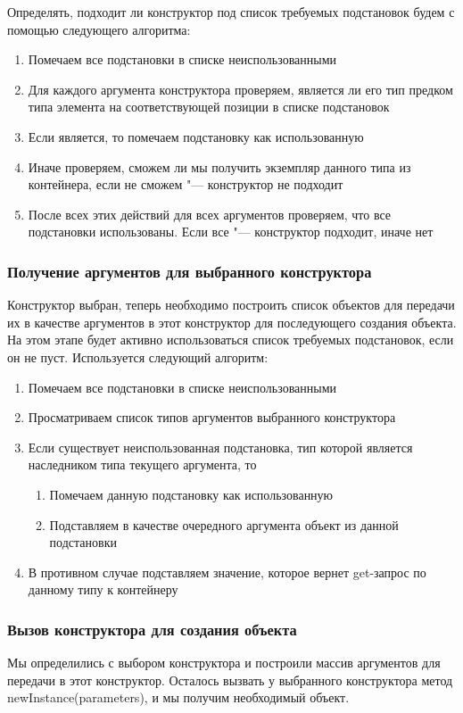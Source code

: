 Определять, подходит ли конструктор под список требуемых подстановок будем с помощью следующего алгоритма:
\begin{enumerate}
	\item Помечаем все подстановки в списке неиспользованными
	\item Для каждого аргумента конструктора проверяем, является ли его тип предком типа элемента на соответствующей позиции в списке подстановок
	\item Если является, то помечаем подстановку как использованную
	\item Иначе проверяем, сможем ли мы получить экземпляр данного типа из контейнера, если не сможем "--- конструктор не подходит
	\item После всех этих действий для всех аргументов проверяем, что все подстановки использованы. Если все "--- конструктор подходит, иначе нет
\end{enumerate}

\subsubsection{Получение аргументов для выбранного конструктора}

Конструктор выбран, теперь необходимо построить список объектов для передачи их в качестве аргументов в этот конструктор для последующего создания объекта.
На этом этапе будет активно использоваться список требуемых подстановок, если он не пуст. Используется следующий алгоритм:

\begin{enumerate}
	\item Помечаем все подстановки в списке неиспользованными
	\item Просматриваем список типов аргументов выбранного конструктора
	\item Если существует неиспользованная подстановка, тип которой является наследником типа текущего аргумента, то
		\begin{enumerate}
			\item Помечаем данную подстановку как использованную
			\item Подставляем в качестве очередного аргумента объект из данной подстановки
		\end{enumerate}
	\item В противном случае подставляем значение, которое вернет get-запрос по данному типу к контейнеру
\end{enumerate}

\subsubsection{Вызов конструктора для создания объекта}

Мы определились с выбором конструктора и построили массив аргументов для передачи в этот конструктор. Осталось вызвать у выбранного конструктора метод newInstance(parameters), и мы получим
необходимый объект.
